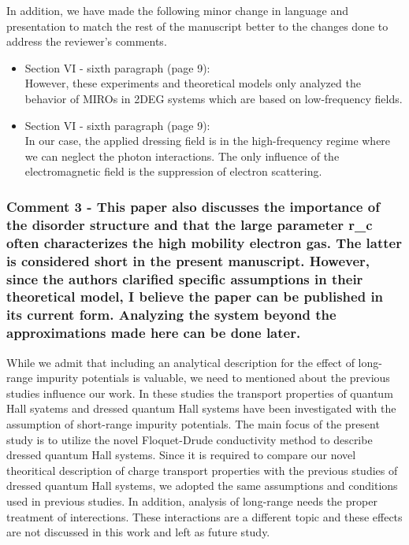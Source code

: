 \documentclass{article}
\begin{document}
In addition, we have made the following minor change in language and presentation to match the rest of the manuscript better to the changes done to address the reviewer’s comments.

\begin{itemize}
  \item Section VI - sixth paragraph (page 9):\\
  {\color{Red}
  However, these experiments and theoretical models only analyzed the behavior of MIROs in 2DEG systems which are based on low-frequency fields.
  }
  \item Section VI - sixth paragraph (page 9):\\
  {\color{Red} In our case, the applied dressing field is in the high-frequency regime where we can neglect the photon interactions. The only influence of the electromagnetic field is the suppression of electron scattering.}
\end{itemize}


\subsubsection*{Comment 3 -
\color{RoyalBlue} This paper also discusses the importance of the disorder structure and that the large parameter r\_c often characterizes the high mobility electron gas. The latter is considered short in the present manuscript. However, since the authors clarified specific assumptions in their theoretical model, I believe the paper can be published in its current form. Analyzing the system beyond the approximations made here can be done later.}

While we admit that including an analytical description for the effect of long-range impurity potentials is valuable, we need to mentioned about the previous studies \cite{dini16,endo09} influence our work. In these studies the transport properties of quantum Hall syatems and dressed quantum Hall systems have been investigated with the assumption of short-range impurity potentials.
The main focus of the present study is to utilize the novel Floquet-Drude conductivity method \cite{wackerl20,wackerlthesis20} to describe dressed quantum Hall systems. Since it is required to compare our novel theoritical description of charge transport properties with the previous studies \cite{dini16,endo09} of dressed quantum Hall systems, we adopted the same assumptions and conditions used in previous studies. In addition, analysis of long-range needs the proper treatment of interections. These interactions are a different topic and these effects are not discussed in this work and left as future study.
\end{document}
